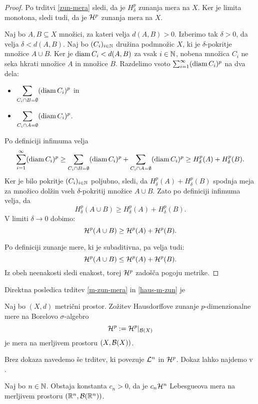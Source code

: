 \begin{proof}
    Po trditvi \ref{zun-mera} sledi, da je \(H^p_\delta\) zunanja mera na \(X\). Ker je limita monotona, sledi tudi, da je \(\mathcal{H}^p\) zunanja mera na \(X\).

    Naj bo \(A, B \subseteq X\) množici, za kateri velja \(d(A, B) > 0\). Izberimo tak \(\delta > 0\), da velja \(\delta < d(A, B)\). Naj bo \((C_i)_{i \in \mathbb{N}}\) družina podmnožic \(X\), ki je \(\delta\)-pokritje množice \(A \cup B\).
    Ker je \(\operatorname{diam} C_i < d(A, B)\) za vsak \(i \in \mathbb{N}\), nobena množica \(C_i\) ne seka hkrati množice \(A\) in množice \(B\). Razdelimo vsoto \(\sum_{i=1}^{\infty} (\operatorname{diam} C_i)^p\) na dva dela:
    \begin{itemize}
        \item \(\displaystyle \sum_{C_i \cap B = \emptyset} (\operatorname{diam} C_i)^p\) in
        \item \(\displaystyle \sum_{C_i \cap A = \emptyset} (\operatorname{diam} C_i)^p\).
    \end{itemize}
    Po definiciji infimuma velja 
    \[\sum_{i=1}^{\infty} (\operatorname{diam} C_i)^p \geq \displaystyle \sum_{C_i \cap B = \emptyset} (\operatorname{diam} C_i)^p + \displaystyle \sum_{C_i \cap A = \emptyset} (\operatorname{diam} C_i)^p \geq H^p_\delta(A) + H^p_\delta(B).\]
    Ker je bilo pokritje \((C_i)_{i \in \mathbb{N}}\) poljubno, sledi, da \(H^p_\delta(A) + H^p_\delta(B)\) spodnja meja za množico dolžin vseh \(\delta\)-pokritij množice \(A \cup B\). Zato po definiciji infimuma velja, da
    \[H_\delta^p(A \cup B) \geq H^p_\delta(A) + H^p_\delta(B).\]
    V limiti \(\delta \to 0\) dobimo:
    \[\mathcal{H}^p(A \cup B) \geq \mathcal{H}^p(A) + \mathcal{H}^p(B).\]

    Po definiciji zunanje mere, ki je subaditivna, pa velja tudi:
    \[\mathcal{H}^p(A \cup B) \leq \mathcal{H}^p(A) + \mathcal{H}^p(B).\]
    Iz obeh neenakosti sledi enakost, torej \(\mathcal{H}^p\) zadošča pogoju metrike.
\end{proof}

Direktna posledica trditev \ref{m-zun-mera} in \ref{haus-m-zun} je
\begin{posledica}
    Naj bo \((X, d)\) metrični prostor. Zožitev Hausdorffove zunanje \(p\)-dimenzionalne mere na Borelovo \(\sigma\)-algebro 
    \[\mathcal{H}^p := \mathcal{H}^p|_{\mathcal{B}(X)}\]
    je mera na merljivem prostoru \((X,\mathcal{B}(X))\).
\end{posledica}

Brez dokaza navedemo še trditev, ki povezuje \(\mathcal{L}^n\) in \(\mathcal{H}^p\). Dokaz lahko najdemo v \cite[stran 351]{f-ra}.
\begin{trditev}
    \label{haus-leb}
    Naj bo \(n \in \mathbb{N}\). Obstaja konstanta \(c_n > 0\), da je \(c_n \mathcal{H}^n\) Lebesgueova mera na merljivem prostoru \((\mathbb{R}^n, \mathcal{B}(\mathbb{R}^n))\).
\end{trditev}

